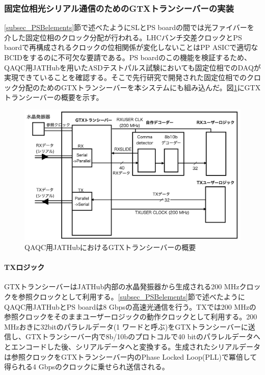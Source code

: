 \subsubsection{固定位相光シリアル通信のためのGTXトランシーバーの実装}
\baselineskip
\label{subsubsec_gtx}
\ref{subsec_PSBelements}節で述べたようにSLとPS boardの間では光ファイバーを介した固定位相のクロック分配が行われる。LHCバンチ交差クロックとPS baordで再構成されるクロックの位相関係が変化しないことはPP ASICで適切なBCIDをするのに不可欠な要請である。PS boardのこの機能を検証するため、QAQC用JATHubを用いたASDテストパルス試験においても固定位相でのDAQが実現できていることを確認する。そこで先行研究で開発された固定位相でのクロック分配のためのGTXトランシーバーを本システムにも組み込んだ。図\ref{JATHubgtx}にGTXトランシーバーの概要を示す。
\baselineskip

\begin{figure} 
\centering
\includegraphics[width=16cm]{fig/QAQC/JATHubgtx.png}
\caption[QAQC用JATHubにおけるGTXトランシーバーの概要]{QAQC用JATHubにおけるGTXトランシーバーの概要}
\label{JATHubgtx}
\end{figure}


\paragraph{TXロジック} \par
GTXトランシーバーはJATHub内部の水晶発振器から生成される200 MHzクロックを参照クロックとして利用する。\ref{subsec_PSBelements}節で述べたようにQAQC用JATHubとPS boardは8 Gbpsの高速光通信を行う。TXでは200 MHzの参照クロックをそのままユーザーロジックの動作クロックとして利用する。200 MHzおきに32bitのパラレルデータ(1 ワードと呼ぶ)をGTXトランシーバーに送信し、GTXトランシーバー内で8b/10bのプロトコルで40 bitのパラレルデータへとエンコードした後、シリアルデータへと変換する。生成されたシリアルデータは参照クロックをGTXトランシーバー内のPhase Locked Loop(PLL)で冪倍して得られる4 Gbpsのクロックに乗せられ送信される。
\baselineskip

